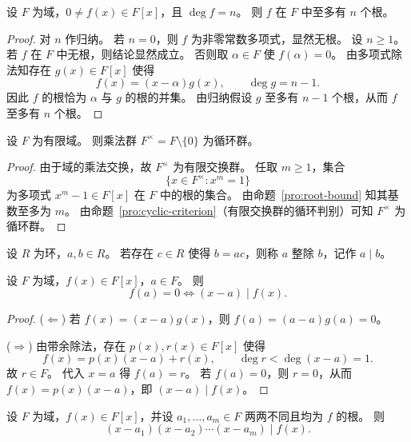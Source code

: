 \documentclass[lang=cn,a4paper,newtx]{elegantbook}
\begin{document}
\begin{proposition}[域上多项式的根数界]\label{root-bound}
  设 $F$ 为域，$0\ne f(x)\in F[x]$，且 $\deg f=n$。
  则 $f$ 在 $F$ 中至多有 $n$ 个根。
\end{proposition}

\begin{proof}
  对 $n$ 作归纳。
  若 $n=0$，则 $f$ 为非零常数多项式，显然无根。
  设 $n\ge 1$。
  若 $f$ 在 $F$ 中无根，则结论显然成立。
  否则取 $\alpha\in F$ 使 $f(\alpha)=0$。
  由多项式除法知存在 $g(x)\in F[x]$ 使得
  \[
    f(x)=(x-\alpha)g(x),\qquad \deg g=n-1.
  \]
  因此 $f$ 的根恰为 $\alpha$ 与 $g$ 的根的并集。
  由归纳假设 $g$ 至多有 $n-1$ 个根，从而 $f$ 至多有 $n$ 个根。
\end{proof}

\begin{corollary}
  设 $F$ 为有限域。
  则乘法群 $F^\times=F\setminus\{0\}$ 为循环群。
\end{corollary}

\begin{proof}
  由于域的乘法交换，故 $F^\times$ 为有限交换群。
  任取 $m\ge 1$，集合
  \[
    \{x\in F^\times:x^m=1\}
  \]
  为多项式 $x^m-1\in F[x]$ 在 $F$ 中的根的集合。
  由命题~\ref{pro:root-bound} 知其基数至多为 $m$。
  由命题~\ref{pro:cyclic-criterion}（有限交换群的循环判别）可知 $F^\times$ 为循环群。
\end{proof}

\begin{definition}[整除]
  设 $R$ 为环，$a,b\in R$。
  若存在 $c\in R$ 使得 $b=ac$，则称 $a$ 整除 $b$，记作 $a\mid b$。
\end{definition}

\begin{proposition}[因式定理]
  设 $F$ 为域，$f(x)\in F[x]$，$a\in F$。
  则
  \[
    f(a)=0\iff (x-a)\mid f(x).
  \]
\end{proposition}

\begin{proof}
  ($\Leftarrow$)
  若 $f(x)=(x-a)g(x)$，则 $f(a)=(a-a)g(a)=0$。

  ($\Rightarrow$)
  由带余除法，存在 $p(x),r(x)\in F[x]$ 使得
  \[
    f(x)=p(x)(x-a)+r(x),\qquad \deg r<\deg(x-a)=1.
  \]
  故 $r\in F$。
  代入 $x=a$ 得 $f(a)=r$。
  若 $f(a)=0$，则 $r=0$，从而 $f(x)=p(x)(x-a)$，即 $(x-a)\mid f(x)$。
\end{proof}

\begin{corollary}
  设 $F$ 为域，$f(x)\in F[x]$，并设 $a_1,\dots,a_m\in F$ 两两不同且均为 $f$ 的根。
  则
  \[
    (x-a_1)(x-a_2)\cdots (x-a_m)\mid f(x).
  \]
\end{corollary}
\end{document}
